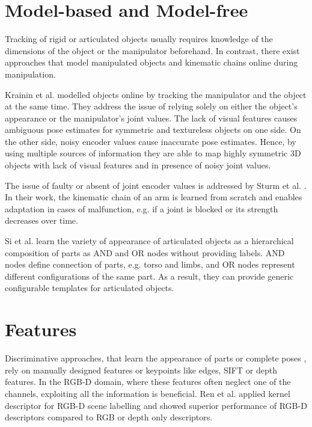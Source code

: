 \section{Model-based and Model-free}

Tracking of rigid or articulated objects usually requires knowledge of the dimensions of the object or the manipulator beforehand. In contrast, there exist approaches that model manipulated objects and kinematic chains online during manipulation.

Krainin et al. \cite{Krainin2011} modelled objects online by tracking the manipulator and the object at the same time.
They address the issue of relying solely on either the object's appearance or the manipulator's joint values. The lack of visual features causes ambiguous pose estimates for symmetric and textureless objects on one side. On the other side, noisy encoder values cause inaccurate pose estimates.
Hence, by using multiple sources of information they are able to map highly symmetric 3D objects with lack of visual features and in presence of noisy joint values.

The issue of faulty or absent of joint encoder values is addressed by Sturm et al. \cite{Sturm2009}. In their work, the kinematic chain of an arm is learned from scratch and enables adaptation in cases of malfunction, e.g. if a joint is blocked or its strength decreases over time.

Si et al. \cite{Si2013} learn the variety of appearance of articulated objects as a hierarchical composition of parts as AND and OR nodes without providing labels. AND nodes define connection of parts, e.g. torso and limbs, and OR nodes represent different configurations of the same part. As a result, they can provide generic configurable templates for articulated objects.

\section{Features}
Discriminative approaches, that learn the appearance of parts \cite{Shotton2013, Krull2015, Pauwels2015} or complete poses \cite{Sharp2015}, rely on manually designed features or keypoints like edges, SIFT \cite{Pauwels2015, Morwald2010} or depth features. In the RGB-D domain, where these features often neglect one of the channels, exploiting all the information is beneficial. Ren et al. \cite{Ren2012} applied kernel descriptor for RGB-D scene labelling and showed superior performance of RGB-D descriptors compared to RGB or depth only descriptors.

